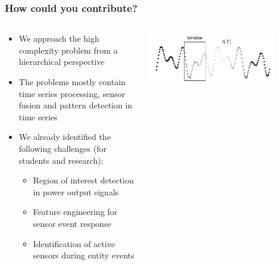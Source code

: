 \begin{frame}
	\frametitle{How could you contribute?}
	\begin{columns}
		\begin{column}{0.6\textwidth}
			\begin{itemize}
				\item We approach the high complexity problem from a hierarchical perspective
				\item The problems mostly contain time series processing, sensor fusion and pattern detection in time series
				\item We already identified the following challenges (for students and research):
				      \begin{itemize}
					      \item Region of interest detection in power output signals
					      \item Feature engineering for sensor event response
					      \item Identification of active sensors during entity events
				      \end{itemize}
			\end{itemize}
		\end{column}
		\begin{column}{0.4\textwidth}
			\vspace*{\fill}
			\begin{flushright}
				\includegraphics[width=0.8\textwidth]{img/research/ROIselection.png}
			\end{flushright}
			\vspace*{\fill}
		\end{column}
	\end{columns}
\end{frame}
